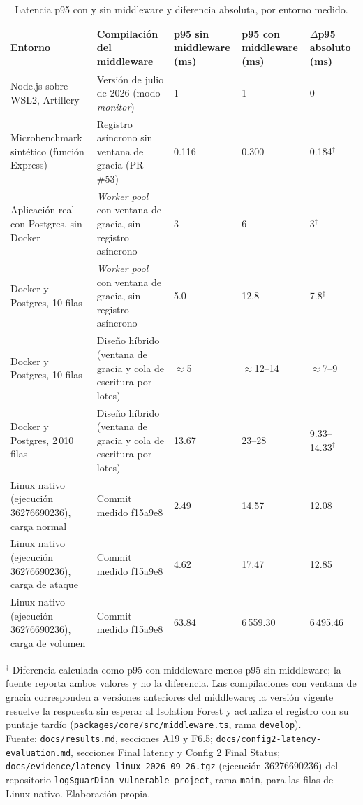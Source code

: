 \begin{table}[htbp]
\centering
\footnotesize
\setlength{\tabcolsep}{3pt}
\begin{tabular}{|p{3.4cm}|p{3.0cm}|p{1.7cm}|p{1.7cm}|p{1.9cm}|}
\hline
\textbf{Entorno} & \textbf{Compilación del middleware} & \textbf{p95 sin middleware (ms)} & \textbf{p95 con middleware (ms)} & \textbf{$\Delta$p95 absoluto (ms)} \\ \hline
Node.js sobre WSL2, Artillery & Versión de julio de 2026 (modo \textit{monitor}) & 1 & 1 & 0 \\ \hline
Microbenchmark sintético (función Express) & Registro asíncrono sin ventana de gracia (PR \#53) & 0.116 & 0.300 & 0.184$^{\dagger}$ \\ \hline
Aplicación real con Postgres, sin Docker & \textit{Worker pool} con ventana de gracia, sin registro asíncrono & 3 & 6 & 3$^{\dagger}$ \\ \hline
Docker y Postgres, 10 filas & \textit{Worker pool} con ventana de gracia, sin registro asíncrono & 5.0 & 12.8 & 7.8$^{\dagger}$ \\ \hline
Docker y Postgres, 10 filas & Diseño híbrido (ventana de gracia y cola de escritura por lotes) & $\approx$5 & $\approx$12--14 & $\approx$7--9 \\ \hline
Docker y Postgres, 2\,010 filas & Diseño híbrido (ventana de gracia y cola de escritura por lotes) & 13.67 & 23--28 & 9.33--14.33$^{\dagger}$ \\ \hline
Linux nativo (ejecución 36276690236), carga normal & Commit medido f15a9e8 & 2.49 & 14.57 & 12.08 \\ \hline
Linux nativo (ejecución 36276690236), carga de ataque & Commit medido f15a9e8 & 4.62 & 17.47 & 12.85 \\ \hline
Linux nativo (ejecución 36276690236), carga de volumen & Commit medido f15a9e8 & 63.84 & 6\,559.30 & 6\,495.46 \\ \hline
\end{tabular}
\caption{Latencia p95 con y sin middleware y diferencia absoluta, por entorno medido.}
\label{tabla:res-overhead}
\par\smallskip\footnotesize $^{\dagger}$ Diferencia calculada como p95 con middleware menos p95 sin middleware; la fuente reporta ambos valores y no la diferencia. Las compilaciones con ventana de gracia corresponden a versiones anteriores del middleware; la versión vigente resuelve la respuesta sin esperar al Isolation Forest y actualiza el registro con su puntaje tardío (\texttt{packages/core/src/middleware.ts}, rama \texttt{develop}).\\
Fuente: \texttt{docs/results.md}, secciones A19 y F6.5; \texttt{docs/config2-latency-evaluation.md}, secciones Final latency y Config 2 Final Status; \texttt{docs/evidence/latency-linux-2026-09-26.tgz} (ejecución 36276690236) del repositorio \texttt{logSguarDian-vulnerable-project}, rama \texttt{main}, para las filas de Linux nativo. Elaboración propia.
\end{table}

